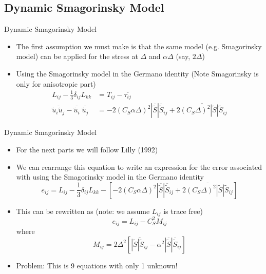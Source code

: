 \subsection{Dynamic Smagorinsky Model}
\begin{frame}{Dynamic Smagorinsky Model}
\begin{itemize}
	\item The first assumption we must make is that the same model (e.g. Smagorinsky model) can be applied for the stress at $\Delta$ and $\alpha \Delta$ (say, $2\Delta$)
	\item Using the Smagorinsky model in the Germano identity (Note Smagorinsky is only for anisotropic part)
	\begin{align*}
	L_{ij} - \frac{1}{3}\delta_{ij}L_{kk} &= T_{ij} - \overline{\tau_{ij}}\\
	\overline{\widetilde{u}_i\widetilde{u}_j} - \overline{\widetilde{u}_i}\;\overline{\widetilde{u}_j} &= -2(C_S \alpha \Delta)^2\left|\overline{\widetilde{S}}\right|\overline{\widetilde{S}}_{ij} + \overline{2(C_S\Delta)^2\left|\widetilde{S}\right|\widetilde{S}_{ij}}
	\end{align*}
\end{itemize}
\end{frame}

\begin{frame}{Dynamic Smagorinsky Model}
\begin{itemize}
	\item  For the next parts we will follow Lilly (1992)
	\item We can rearrange this equation to write an expression for the error associated with
using the Smagorinsky model in the Germano identity
	$$e_{ij} = L_{ij} - \frac{1}{3}\delta_{ij}L_{kk}-\left[-2(C_S \alpha \Delta)^2\left|\overline{\widetilde{S}}\right|\overline{\widetilde{S}}_{ij} + \overline{2(C_S\Delta)^2\left|\widetilde{S}\right|\widetilde{S}_{ij}}\right]$$
	\item This can be rewritten as (note: we assume $L_{ij}$ is trace free)
	$$e_{ij} = L_{ij} - C_S^2 M_{ij}$$
	where
	$$M_{ij} = 2\Delta^2\left[\overline{\left|\widetilde{S}\right|\widetilde{S}_{ij}} - \alpha^2\left|\overline{\widetilde{S}}\right|\overline{\widetilde{S}}_{ij}\right]$$
	\item Problem: This is 9 equations with only 1 unknown!
\end{itemize}
\end{frame}


